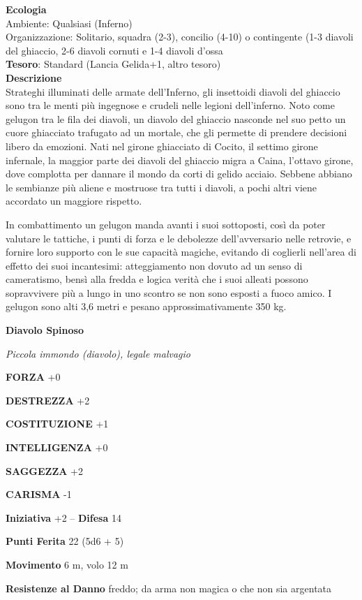 \begin{multicols}{2}
\textbf{Ecologia}\\
Ambiente: Qualsiasi (Inferno)\\
Organizzazione: Solitario, squadra (2-3), concilio (4-10) o contingente (1-3 diavoli del ghiaccio, 2-6 diavoli cornuti e 1-4 diavoli d'ossa\\
\textbf{Tesoro}: Standard (Lancia Gelida+1, altro tesoro)\\
\textbf{Descrizione}\\
Strateghi illuminati delle armate dell'Inferno, gli insettoidi diavoli del ghiaccio sono tra le menti più ingegnose e crudeli nelle legioni dell'inferno. Noto come gelugon tra le fila dei diavoli, un diavolo del ghiaccio nasconde nel suo petto un cuore ghiacciato trafugato ad un mortale, che gli permette di prendere decisioni libero da emozioni. Nati nel girone ghiacciato di Cocito, il settimo girone infernale, la maggior parte dei diavoli del ghiaccio migra a Caina, l'ottavo girone, dove complotta per dannare il mondo da corti di gelido acciaio. Sebbene abbiano le sembianze più aliene e mostruose tra tutti i diavoli, a pochi altri viene accordato un maggiore rispetto.

In combattimento un gelugon manda avanti i suoi sottoposti, così da poter valutare le tattiche, i punti di forza e le debolezze dell'avversario nelle retrovie, e fornire loro supporto con le sue capacità magiche, evitando di coglierli nell'area di effetto dei suoi incantesimi: atteggiamento non dovuto ad un senso di cameratismo, bensì alla fredda e logica verità che i suoi alleati possono sopravvivere più a lungo in uno scontro se non sono esposti a fuoco amico. I gelugon sono alti 3,6 metri e pesano approssimativamente 350 kg.


\medskip{}\textbf{Diavolo Spinoso}

\textit{Piccola immondo (diavolo), legale malvagio}

\textbf{FORZA} +0

\textbf{DESTREZZA} +2

\textbf{COSTITUZIONE} +1

\textbf{INTELLIGENZA} +0

\textbf{SAGGEZZA} +2

\textbf{CARISMA} -1

\textbf{Iniziativa} +2 -- \textbf{Difesa} 14

\textbf{Punti Ferita} 22 (5d6 + 5)

\textbf{Movimento} 6 m, volo 12 m

\textbf{Resistenze al Danno} freddo; da arma non magica o che non sia argentata


\end{multicols}
